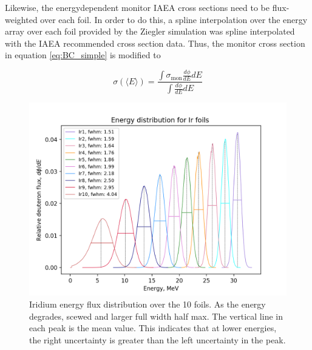 \noindent 
Likewise, the energydependent monitor IAEA cross sections need to be flux-weighted over each foil. In order to do this, a spline interpolation over the energy array over each foil provided by the Ziegler simulation was spline interpolated with the IAEA recommended cross section data. Thus, the monitor cross section in equation \ref{eq:BC_simple} is modified to 


\begin{equation}
    \sigma (\langle E\rangle) = \frac{\int \sigma_\text{mon} \frac{d\phi}{dE}dE}{\int \frac{d\phi}{dE}dE}
\end{equation}


\begin{figure}
    \centering
    \includegraphics{Analysis/Ir_flux_distribution_B_+2_D_+4,25.png}
    \caption{Iridium energy flux distribution over the 10 foils. As the energy degrades, scewed and larger full width half max. The vertical line in each peak is the mean value. This indicates that at lower energies, the right uncertainty is greater than the left uncertainty in the peak.}
    \label{fig:ir_energyflux}
\end{figure}

